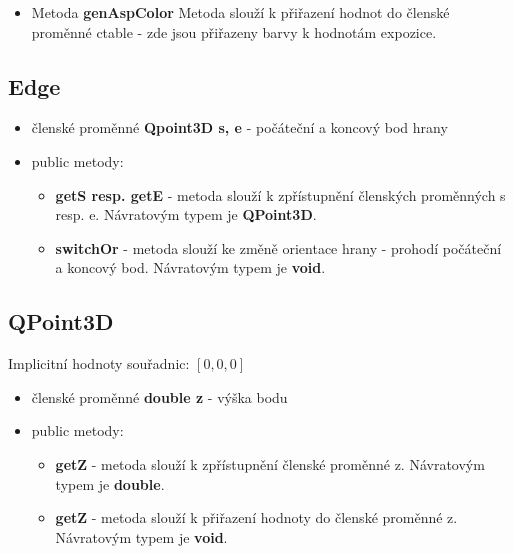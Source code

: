 \documentclass[a4paper, 12pt]{article}
\begin{document}
\begin{itemize}
\begin{itemize}
	
	\item Metoda \textbf{genAspColor}
	Metoda slouží k přiřazení hodnot do členské proměnné ctable - zde jsou přiřazeny barvy k hodnotám expozice.


\end{itemize}
\end{itemize}


\subsection{Edge}

\begin{itemize}
	\item členské proměnné \textbf{Qpoint3D s, e} - počáteční a koncový bod hrany
	\item public metody:
	\begin{itemize}
		\item \textbf{getS resp. getE} - metoda slouží k zpřístupnění členských proměnných s resp. e. Návratovým typem je \textbf{QPoint3D}. 
		\item \textbf{switchOr} - metoda slouží ke změně orientace hrany - prohodí počáteční a koncový bod. Návratovým typem je \textbf{void}. 
	\end{itemize}
\end{itemize}

\subsection{QPoint3D}

Implicitní hodnoty souřadnic: $[0,0,0]$
\begin{itemize}
	\item členské proměnné \textbf{double z} - výška bodu
	\item public metody:
	\begin{itemize}
		\item \textbf{getZ} - metoda slouží k zpřístupnění členské proměnné z. Návratovým typem je \textbf{double}. 
		\item \textbf{getZ} - metoda slouží k přiřazení hodnoty do členské proměnné z. Návratovým typem je \textbf{void}. 
	\end{itemize}
\end{itemize}
\end{document}
